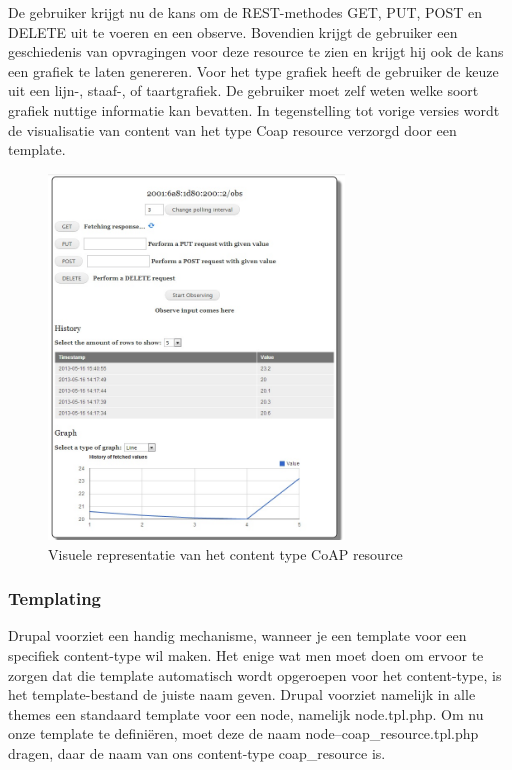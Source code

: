 De gebruiker krijgt nu de kans om de REST-methodes  GET, PUT, POST en DELETE uit te voeren en een observe. Bovendien krijgt de gebruiker een geschiedenis van opvragingen voor deze resource te zien en krijgt hij ook de kans een grafiek te laten genereren. Voor het type grafiek heeft de gebruiker de keuze uit een lijn-, staaf-, of taartgrafiek. De gebruiker moet zelf weten welke soort grafiek nuttige informatie kan bevatten. In tegenstelling tot vorige versies wordt de visualisatie van content van het type Coap resource verzorgd door een template.
\begin{figure}[h!]
\centering
\includegraphics[width=0.7\textwidth]{fig/coap_resource}
\caption{Visuele representatie van het content type CoAP resource}
\label{fig:coapResource}
\end{figure}

\subsubsection{Templating}\label{templating}
Drupal voorziet een handig mechanisme, wanneer je een template voor een specifiek content-type wil maken. Het enige wat men moet doen om ervoor te zorgen dat die template automatisch wordt opgeroepen voor het content-type, is het template-bestand de juiste naam geven. Drupal voorziet namelijk in alle themes een standaard template voor een node, namelijk node.tpl.php. Om nu onze template te defini\"{e}ren, moet deze de naam node--coap\_resource.tpl.php dragen, daar de naam van ons content-type coap\_resource is.\\

